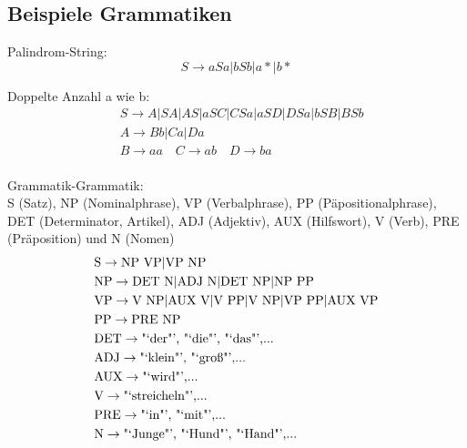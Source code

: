 \documentclass[german,color,6pt]{latex4ei/latex4ei_sheet}
\begin{document}
\begin{sectionbox}
	\subsection{Beispiele Grammatiken}
	Palindrom-String:
	\begin{equation*}
	S \rightarrow aSa | bSb | a* | b*
	\end{equation*}

	Doppelte Anzahl a wie b:
	\begin{equation*}
	\begin{split}
		& S \rightarrow A | SA | AS | aSC | CSa | aSD | DSa | bSB | BSb \\
		& A \rightarrow Bb | Ca | Da \\
		& B \rightarrow aa \quad C \rightarrow ab \quad D \rightarrow ba \\
	\end{split}
	\end{equation*}

	Grammatik-Grammatik:\\
	S (Satz), NP (Nominalphrase), VP (Verbalphrase), PP (Päpositionalphrase), DET (Determinator, Artikel), ADJ (Adjektiv), AUX (Hilfswort), V (Verb), PRE (Präposition) und N (Nomen)
	\begin{equation*}
	\begin{split}
		&  \text{S} \rightarrow \text{NP VP} | \text{VP NP}\\
		& \text{NP} \rightarrow  \text{DET N} |  \text{ADJ N} |  \text{DET NP} |  \text{NP PP}\\
		&  \text{VP} \rightarrow  \text{V NP} |  \text{AUX V} |  \text{V PP} |  \text{V NP} |  \text{VP PP} |  \text{AUX VP}\\
		&  \text{PP} \rightarrow  \text{PRE NP}\\
		&  \text{DET} \rightarrow  \text{"`der"', "`die"', "`das"',...}\\
		&  \text{ADJ} \rightarrow  \text{"`klein"', "`groß"',...}\\
		&  \text{AUX} \rightarrow  \text{"`wird"',...}\\
		&  \text{V} \rightarrow  \text{"`streicheln"',...}\\
		&  \text{PRE} \rightarrow  \text{"`in"', "`mit"',...}\\
		&  \text{N} \rightarrow  \text{"`Junge"', "`Hund"', "`Hand"',...}\\
	\end{split}
	\end{equation*}
\end{sectionbox}
\end{document}
